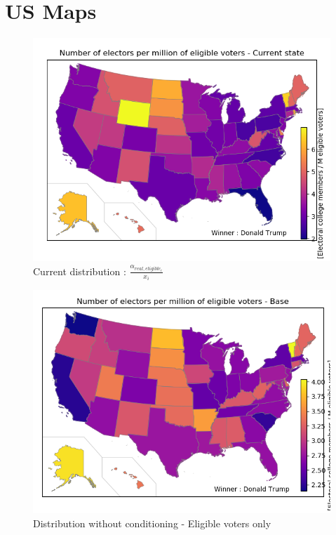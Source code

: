 \documentclass[a4paper,10pt,calibri,oneside,openany, twocolumn]{report}
\theoremstyle{break}
\begin{document}
\section*{US Maps}

\begin{figure}[H]
	\centering
	\includegraphics[width=\linewidth]{mapCurrentEligible}
	\caption{Current distribution : $\frac{\alpha_{real,eligible_i}}{x_i}$}
\end{figure}
\begin{figure}[H]
	\centering
	\includegraphics[width=\linewidth]{mapEligibleBase}
	\caption{Distribution without conditioning - Eligible voters only}
\end{figure}
\end{document}
